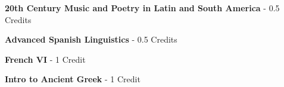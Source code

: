 
\vspace{3mm}\noindent\textbf{20th Century Music and Poetry in Latin and South America}  - 0.5 Credits

\vspace{3mm}\noindent\textbf{Advanced Spanish Linguistics}  - 0.5 Credits

\vspace{3mm}\noindent\textbf{French VI}  - 1 Credit

\vspace{3mm}\noindent\textbf{Intro to Ancient Greek}  - 1 Credit

\vspace{3mm}